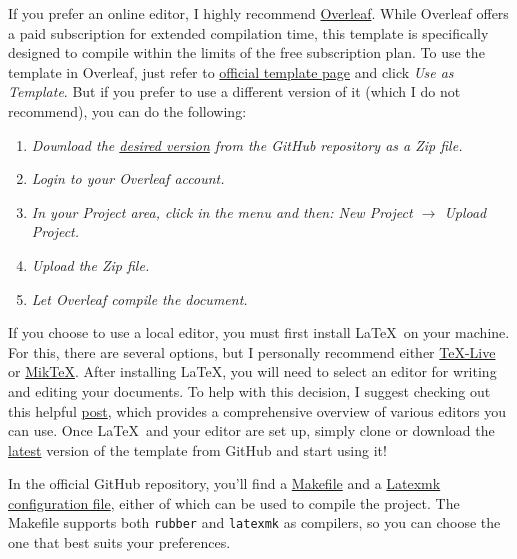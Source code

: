 If you prefer an online editor, I highly recommend \href{https://www.overleaf.com/}{Overleaf}. While Overleaf offers a paid subscription for extended compilation time, this template is specifically designed to compile within the limits of the free subscription plan. To use the template in Overleaf, just refer to \href{https://www.overleaf.com/latex/templates/unofficial-polytechnic-university-of-leiria-estg-thesis-slash-report-template/tqgbrncfhwgt}{official template page} and click \textit{Use as Template}. But if you prefer to use a different version of it (which I do not recommend), you can do the following:

\begin{enumerate}[font=\itshape]
    \setlength{\itemsep}{.375em}
    \item \textit{Download the \href{https://github.com/joseareia/ipleiria-thesis/releases}{desired version} from the GitHub repository as a Zip file.}
    \item \textit{Login to your Overleaf account.}
    \item \textit{In your Project area, click in the menu and then: New Project \(\to\) Upload Project.}
    \item \textit{Upload the Zip file.}
    \item \textit{Let Overleaf compile the document.}
\end{enumerate}

If you choose to use a local editor, you must first install \LaTeX~on your machine. For this, there are several options, but I personally recommend either \href{https://www.tug.org/texlive/}{TeX-Live} or \href{https://miktex.org/}{MikTeX}. After installing \LaTeX, you will need to select an editor for writing and editing your documents. To help with this decision, I suggest checking out this helpful \href{https://tex.stackexchange.com/questions/339/latex-editors-ides}{post}, which provides a comprehensive overview of various editors you can use. Once \LaTeX~and your editor are set up, simply clone or download the \href{https://github.com/joseareia/ipleiria-thesis/releases}{latest} version of the template from GitHub and start using it!

\begin{block}[tip]
In the official GitHub repository, you'll find a \href{https://github.com/joseareia/ipleiria-thesis/blob/master/Makefile}{Makefile} and a \href{https://github.com/joseareia/ipleiria-thesis/blob/master/.latexmkrc}{Latexmk configuration file}, either of which can be used to compile the project. The Makefile supports both \texttt{rubber} and \texttt{latexmk} as compilers, so you can choose the one that best suits your preferences.
\end{block}

